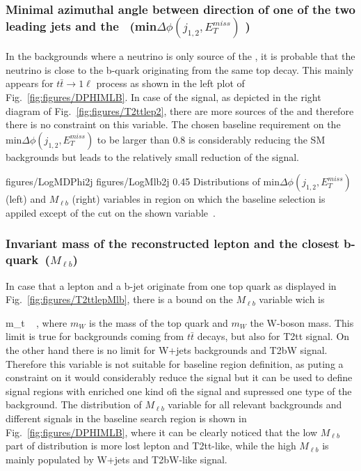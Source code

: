 \subsubsection{Minimal azimuthal angle between direction of one of the two leading jets and the \MET~(min$\Delta \phi (j_{1,2}, E_{T}^{miss})$ )}

In the backgrounds where a neutrino is only source of the \MET, it is probable that the neutrino is close to the b-quark  originating from the same top decay. This mainly appears for $t\bar{t} \to 1\ell$ process as shown in the left plot of Fig.~\ref{fig:figures/DPHIMLB}. In case of the signal, as depicted in the right diagram of Fig.~\ref{fig:figures/T2ttlep2}, there are more sources of the \MET and therefore there is no constraint on this variable. The chosen baseline requirement on the min$\Delta \phi (j_{1,2}, E_{T}^{miss})$ to be larger than 0.8 is considerably reducing the SM backgrounds but leads to the relatively small reduction of the signal.

                 {figures/LogMDPhi2j} %
                 {figures/LogMlb2j} %
                 {0.45}       %
                 { Distributions of min$\Delta \phi (j_{1,2}, E_{T}^{miss})$ (left) and $M_{\ell b}$ (right) variables in region on which the baseline selection is appiled except of the cut on the shown variable~\cite{website:stopSupp}. }

\subsubsection{Invariant mass of the reconstructed lepton and the closest b-quark~($M_{\ell b}$)}

In case that a lepton and a b-jet originate from one top quark as displayed in Fig.~\ref{fig:figures/T2ttlepMlb}, there is a bound on the $M_{\ell b}$ variable wich is

{
 m_{t}  ~ ,
}
where $m_{W}$ is the mass of the top quark and $m_{W}$ the W-boson mass. This limit is true for backgrounds coming from $t\bar{t}$ decays, but also for T2tt signal. On the other hand there is no limit for W+jets backgrounds and T2bW signal. Therefore this variable is not suitable for baseline region definition, as puting a constraint on it would considerably reduce the signal but it can be used to define signal regions with enriched one kind ofi the signal and supressed one type of the background. The distribution of  $M_{\ell b}$ variable for all relevant backgrounds and different signals in the baseline search region is shown in Fig.~\ref{fig:figures/DPHIMLB}, where it can be clearly noticed that the low $M_{\ell b}$ part of distribution is more lost lepton and T2tt-like, while the high $M_{\ell b}$ is mainly populated by W+jets and T2bW-like signal.


